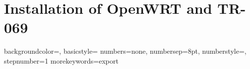 
\chapter{Installation of OpenWRT and TR-069} %

\label{AppendixA} %


{
    backgroundcolor=\color{black},
    basicstyle=\scriptsize\color{white}\ttfamily
    numbers=none,
    numbersep=8pt,                   %
    numberstyle=\tiny\color{white}, %
    stepnumber=1                    %
}
{
  morekeywords={export}
}
